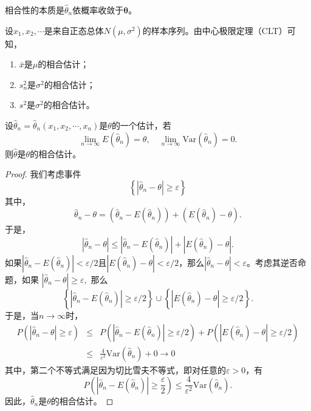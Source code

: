 \begin{remark}
相合性的本质是$\hat{\theta}_{n}$依概率收敛于$\bm\theta$。
\end{remark}

\begin{example}
设$x_1,x_2,\cdots$是来自正态总体$N(\mu,\sigma^2)$的样本序列。由中心极限定理（CLT）可知，
\begin{enumerate}
    \item $\bar{x}$是$\mu$的相合估计；
    \item $s_{n}^{2}$是$\sigma^{2}$的相合估计；
    \item $s^{2}$是$\sigma^{2}$的相合估计。
\end{enumerate}
\end{example}
\begin{theorem}
设$\hat{\theta}_n = \hat{\theta}_n (x_1,x_2,\cdots,x_n)$是$\theta$的一个估计，若
$$
\lim_{n\rightarrow \infty} E(\hat{\theta}_n) = \theta,\quad \lim_{n\rightarrow \infty} \text{Var}(\hat{\theta}_n) = 0.
$$
则$\hat{\theta}$是$\theta$的相合估计。
\end{theorem}
\begin{proof}
我们考虑事件
$$
\left\{ |\hat{\theta}_n - \theta| \geq  \varepsilon \right\}
$$
其中，
$$
\hat{\theta}_n - \theta = \left(\hat{\theta}_n - E(\hat{\theta}_n)  \right) +  \left(  E(\hat{\theta}_n)  - \theta\right).
$$
于是，
$$
|\hat{\theta}_n - \theta|  \leq \left|\hat{\theta}_n - E(\hat{\theta}_n)  \right| +  \left|  E(\hat{\theta}_n)  - \theta\right|.
$$
如果$\left|\hat{\theta}_n - E(\hat{\theta}_n)  \right|  < \varepsilon/2$且$\left|  E(\hat{\theta}_n)  - \theta\right|< \varepsilon/2$，那么$\left|\hat{\theta}_n - \theta\right| <\varepsilon$。考虑其逆否命题，如果
$
\left|\hat{\theta}_n - \theta\right| \geq \varepsilon,
$
那么
$$\left\{\left|\hat{\theta}_n - E(\hat{\theta}_n)  \right|  \geq \varepsilon/2 \right\} \cup \left\{\left|  E(\hat{\theta}_n)  - \theta\right|\geq  \varepsilon/2\right\}.
$$
于是，当$n\rightarrow \infty$时，
\begin{eqnarray*}
    P\left( |\hat{\theta}_n - \theta| \geq \varepsilon \right) &\leq& P\left( \left|\hat{\theta}_n - E(\hat{\theta}_n)  \right|  \geq \varepsilon/2 \right) + P\left( \left|  E(\hat{\theta}_n)  - \theta\right|\geq  \varepsilon/2 \right)\\
    &\leq & \frac{4}{\varepsilon^2} \text{Var}(\hat{\theta}_n) + 0 \rightarrow 0 
\end{eqnarray*}
其中，第二个不等式满足因为切比雪夫不等式，即对任意的$\varepsilon >0$，有
$$
P\left( |\hat{\theta}_n - E(\hat{\theta}_n)| \geq \frac{\varepsilon}{2} \right)\leq \frac{4}{\varepsilon^2} \text{Var}(\hat{\theta}_n).
$$
因此，$\hat{\theta}_n$是$\theta$的相合估计。
\end{proof}
